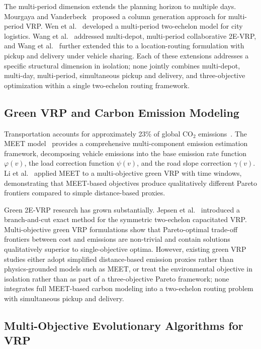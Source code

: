 \documentclass[11pt, a4paper]{article}
\numberwithin{equation}{section}
\begin{document}
The multi-period dimension extends the planning horizon to multiple days.
Mourgaya and Vanderbeck~\cite{mourgaya2007} proposed a column generation
approach for multi-period VRP\@.  Wen et al.~\cite{wen2010} developed a
multi-period two-echelon model for city logistics.  Wang
et al.~\cite{wang2021} addressed multi-depot, multi-period collaborative
2E-VRP, and Wang et al.~\cite{wang2023} further extended this to a
location-routing formulation with pickup and delivery under vehicle sharing.
Each of these extensions addresses a specific structural dimension in isolation;
none jointly combines multi-depot, multi-day, multi-period, simultaneous pickup
and delivery, and three-objective optimization within a single two-echelon
routing framework.

\subsection{Green VRP and Carbon Emission Modeling}

Transportation accounts for approximately 23\% of global CO$_2$
emissions~\cite{iea2022}.  The MEET model~\cite{hickman1999} provides a
comprehensive multi-component emission estimation framework, decomposing
vehicle emissions into the base emission rate function $\varphi(v)$, the load
correction function $\psi(v)$, and the road slope correction $\gamma(v)$.
Li et al.~\cite{li2025} applied MEET to a multi-objective green VRP with time
windows, demonstrating that MEET-based objectives produce qualitatively
different Pareto frontiers compared to simple distance-based proxies.

Green 2E-VRP research has grown substantially.  Jepsen
et al.~\cite{jepsen2013} introduced a branch-and-cut exact method for the
symmetric two-echelon capacitated VRP\@.  Multi-objective green VRP
formulations show that Pareto-optimal trade-off frontiers between cost and
emissions are non-trivial and contain solutions qualitatively superior to
single-objective optima.
However, existing green VRP studies either adopt simplified distance-based
emission proxies rather than physics-grounded models such as MEET, or treat the
environmental objective in isolation rather than as part of a three-objective
Pareto framework; none integrates full MEET-based carbon modeling into a
two-echelon routing problem with simultaneous pickup and delivery.

\subsection{Multi-Objective Evolutionary Algorithms for VRP}
\end{document}
